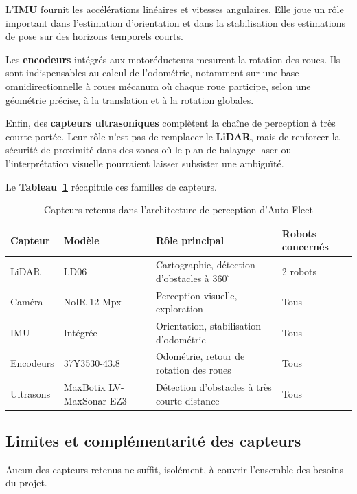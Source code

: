 \documentclass[11pt,a4paper]{report}
\newcommand{\kw}[1]{\textbf{#1}}
\begin{document}
L’\kw{IMU} fournit les accélérations linéaires et vitesses angulaires. Elle joue un rôle important dans l’estimation d’orientation et dans la stabilisation des estimations de pose sur des horizons temporels courts.

Les \kw{encodeurs} intégrés aux motoréducteurs mesurent la rotation des roues. Ils sont indispensables au calcul de l’odométrie, notamment sur une base omnidirectionnelle à roues mécanum où chaque roue participe, selon une géométrie précise, à la translation et à la rotation globales.

Enfin, des \kw{capteurs ultrasoniques} complètent la chaîne de perception à très courte portée. Leur rôle n’est pas de remplacer le \kw{LiDAR}, mais de renforcer la sécurité de proximité dans des zones où le plan de balayage laser ou l’interprétation visuelle pourraient laisser subsister une ambiguïté.

Le \kw{Tableau~\ref{tab:capteurs_flotte}} récapitule ces familles de capteurs.

\begin{table}[H]
\centering
\setlength{\tabcolsep}{4pt}
\renewcommand{\arraystretch}{1.3}
\begin{tabular}{|p{2.2cm}|p{2.8cm}|p{4.5cm}|p{2.8cm}|}
\hline
\textbf{Capteur} & \textbf{Modèle} & \textbf{Rôle principal} & \textbf{Robots concernés} \\
\hline
LiDAR & LD06 & Cartographie, détection d'obstacles à \(360^\circ\) & 2 robots \\
\hline
Caméra & NoIR 12 Mpx & Perception visuelle, exploration & Tous \\
\hline
IMU & Intégrée & Orientation, stabilisation d’odométrie & Tous \\
\hline
Encodeurs & 37Y3530-43.8 & Odométrie, retour de rotation des roues & Tous \\
\hline
Ultrasons & MaxBotix LV-MaxSonar-EZ3 & Détection d’obstacles à très courte distance & Tous \\
\hline
\end{tabular}
\caption{Capteurs retenus dans l’architecture de perception d’Auto Fleet}
\label{tab:capteurs_flotte}
\end{table}

\subsection{Limites et complémentarité des capteurs}

Aucun des capteurs retenus ne suffit, isolément, à couvrir l’ensemble des besoins du projet.
\end{document}
